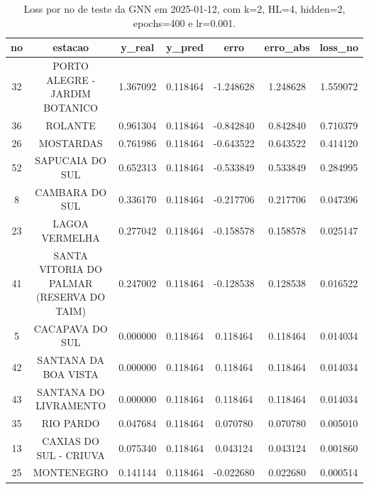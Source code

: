 \begin{table}[h]
\centering
\caption{Loss por no de teste da GNN em 2025-01-12, com k=2, HL=4, hidden=2, epochs=400 e lr=0.001.}
\label{tab:gnn_loss_k2_hl4_h2_e400_d20250112}
\begin{tabular}{ccccccc}
\toprule
no & estacao & y\_real & y\_pred & erro & erro\_abs & loss\_no \\
\midrule
32 & PORTO ALEGRE - JARDIM BOTANICO & 1.367092 & 0.118464 & -1.248628 & 1.248628 & 1.559072 \\
36 & ROLANTE & 0.961304 & 0.118464 & -0.842840 & 0.842840 & 0.710379 \\
26 & MOSTARDAS & 0.761986 & 0.118464 & -0.643522 & 0.643522 & 0.414120 \\
52 & SAPUCAIA DO SUL & 0.652313 & 0.118464 & -0.533849 & 0.533849 & 0.284995 \\
8 & CAMBARA DO SUL & 0.336170 & 0.118464 & -0.217706 & 0.217706 & 0.047396 \\
23 & LAGOA VERMELHA & 0.277042 & 0.118464 & -0.158578 & 0.158578 & 0.025147 \\
41 & SANTA VITORIA DO PALMAR (RESERVA DO TAIM) & 0.247002 & 0.118464 & -0.128538 & 0.128538 & 0.016522 \\
5 & CACAPAVA DO SUL & 0.000000 & 0.118464 & 0.118464 & 0.118464 & 0.014034 \\
42 & SANTANA DA BOA VISTA & 0.000000 & 0.118464 & 0.118464 & 0.118464 & 0.014034 \\
43 & SANTANA DO LIVRAMENTO & 0.000000 & 0.118464 & 0.118464 & 0.118464 & 0.014034 \\
35 & RIO PARDO & 0.047684 & 0.118464 & 0.070780 & 0.070780 & 0.005010 \\
13 & CAXIAS DO SUL - CRIUVA & 0.075340 & 0.118464 & 0.043124 & 0.043124 & 0.001860 \\
25 & MONTENEGRO & 0.141144 & 0.118464 & -0.022680 & 0.022680 & 0.000514 \\
\bottomrule
\end{tabular}
\end{table}
